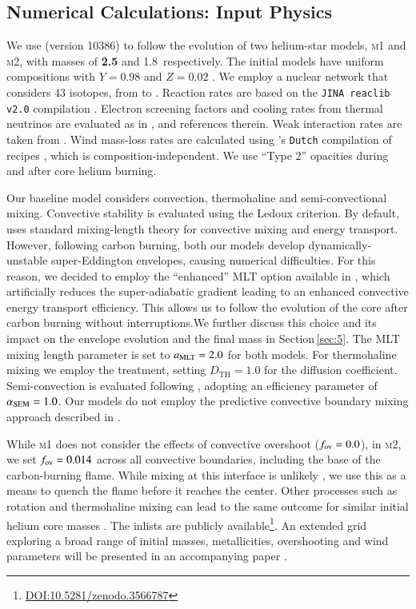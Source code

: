 \documentclass[twocolumn]{aa}
\begin{document}
\subsection{Numerical Calculations: Input Physics}\label{sec:2.1}
We use \mesa (version 10386) to follow the evolution of two helium-star models, \textsc{m1} and \textsc{m2}, with  masses of  {\bf 2.5} and 1.8\msun\ respectively. 
The initial models have uniform compositions with $Y=0.98$ and $Z=0.02$ \citep[solar abundances are taken from ][]{grevesse1998}. We employ a nuclear network that considers 43  isotopes, from  to . Reaction rates are based on the \texttt{JINA reaclib v2.0} compilation \citep{cyburt2010}. Electron screening factors and cooling rates from thermal neutrinos are evaluated as in \cite{Farmer:2015afs}, and references therein. 
Weak interaction rates are taken from \cite{Suzuki:2015iry}. 
Wind mass-loss rates are calculated using \mesa's \texttt{Dutch} compilation of recipes  \citep{Paxton:2013pj},  which is composition-independent. We use ``Type 2'' opacities during and after core helium burning.

Our baseline  model considers convection, thermohaline and semi-convectional mixing. Convective stability is 
evaluated using the Ledoux criterion. By default, \mesa uses  standard mixing-length theory  \citep[MTL;][]{cox1968} for convective mixing and energy transport. However, following carbon burning, both our models develop 
dynamically-unstable super-Eddington envelopes, causing numerical 
difficulties. For this reason, we decided to employ the ``enhanced'' MLT 
option available in \mesa \citep{Paxton:2013pj}, which artificially reduces 
the super-adiabatic gradient leading to  an enhanced convective energy 
transport efficiency.  This  allows us to follow the evolution of the core 
after carbon burning without interruptions.We further discuss this choice and its impact on the envelope evolution and the final mass in Section\,\ref{sec:5}. 
The MLT mixing length parameter is set to $a_{\rm MLT}=2.0$ for both models. For 
thermohaline mixing we employ 
the \cite{kippenhahn1980} 
 treatment, setting $D_{\text{TH}} = 1.0$ for the diffusion coefficient. Semi-convection is evaluated following \cite{langer1983}, adopting an efficiency parameter of $\alpha_{{\rm SEM}} = 1.0$. Our models do not employ the predictive convective boundary mixing approach described in \cite{Paxton:2017eie}. 

While \textsc{m1} does not consider the effects of convective overshoot ($f_{\rm ov}=0.0$), in \textsc{m2}, we set $f_{\rm ov}=0.014$ across all convective boundaries, including the base of the 
carbon-burning flame. While mixing at this interface is unlikely \citep{lecoanet2016}, 
we use this as a means to  quench the flame before it reaches the center.  
Other processes such as rotation and thermohaline mixing can lead to the 
same outcome for similar initial helium core masses \citep{Farmer:2015afs}.
The \mesa inlists are publicly available\footnote{\url{DOI:10.5281/zenodo.3566787}}. 
An  extended grid exploring a broad range of initial masses, 
metallicities, overshooting and wind parameters will be presented in an 
accompanying paper \citep{chanlaridis2019}.       
\end{document}
